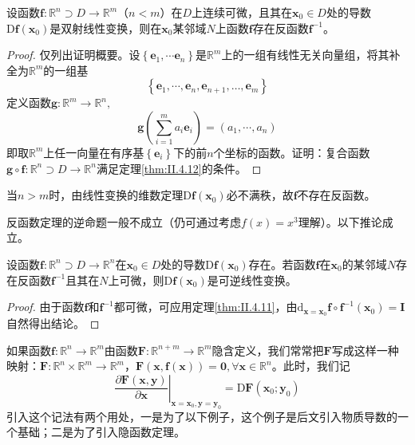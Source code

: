 \documentclass[../main.tex]{subfiles}
\begin{document}
\begin{corollary}
    设函数$\mathbf{f}:\mathbb{R}^n\supset D\rightarrow\mathbb{R}^m$（$n<m$）在$D$上连续可微，且其在$\mathbf{x}_0\in D$处的导数$\mathrm{D}\mathbf{f}\left(\mathbf{x}_0\right)$是双射线性变换，则在$\mathbf{x}_0$某邻域$N$上函数$\mathbf{f}$存在反函数$\mathbf{f}^{-1}$。
\end{corollary}
\begin{proof}
    仅列出证明概要。设$\left\{\mathbf{e}_1,\cdots\mathbf{e}_n\right\}$是$\mathbb{R}^m$上的一组有线性无关向量组，将其补全为$\mathbb{R}^m$的一组基
    \[\left\{\mathbf{e}_1,\cdots,\mathbf{e}_n,\mathbf{e}_{n+1},\dots,\mathbf{e}_m\right\}\]
    定义函数$\mathbf{g}:\mathbb{R}^m\rightarrow\mathbb{R}^n,$
    \[\mathbf{g}\left(\sum_{i=1}^m a_i\mathbf{e}_i\right)=\left(a_1,\cdots,a_n\right)\]
    即取$\mathbb{R}^m$上任一向量在有序基$\left\{\mathbf{e}_i\right\}$下的前$n$个坐标的函数。证明：复合函数$\mathbf{g}\circ\mathbf{f}:\mathbb{R}^n\supset D\rightarrow\mathbb{R}^n$满足定理\ref{thm:II.4.12}的条件。

\end{proof}

当$n>m$时，由线性变换的维数定理$\mathrm{D}\mathbf{f}\left(\mathbf{x}_0\right)$必不满秩，故$\mathbf{f}$不存在反函数。

反函数定理的逆命题一般不成立（仍可通过考虑$f\left(x\right)=x^3$理解）。以下推论成立。

\begin{corollary}
    设函数$\mathbf{f}:\mathbb{R}^n\supset D\rightarrow\mathbb{R}^n$在$\mathbf{x}_0\in D$处的导数$\mathrm{D}\mathbf{f}\left(\mathbf{x}_0\right)$存在。若函数$\mathbf{f}$在$\mathbf{x}_0$的某邻域$N$存在反函数$\mathbf{f}^{-1}$且其在$N$上可微，则$\mathrm{D}\mathbf{f}\left(\mathbf{x}_0\right)$是可逆线性变换。
\end{corollary}
\begin{proof}
    由于函数$\mathbf{f}$和$\mathbf{f}^{-1}$都可微，可应用定理\ref{thm:II.4.11}，由$\mathrm{d}_{\mathbf{x}=\mathbf{x}_0}\mathbf{f}\circ\mathbf{f}^{-1}\left(\mathbf{x}_0\right)=\mathbf{I}$自然得出结论。
\end{proof}

如果函数$\mathbf{f}:\mathbb{R}^n\rightarrow\mathbb{R}^m$由函数$\mathbf{F}:\mathbb{R}^{n+m}\rightarrow\mathbb{R}^m$隐含定义，我们常常把$\mathbf{F}$写成这样一种映射：$\mathbf{F}:\mathbb{R}^n\times\mathbb{R}^m\rightarrow\mathbb{R}^m$，$\mathbf{F}\left(\mathbf{x},\mathbf{f}\left(\mathbf{x}\right)\right)=\mathbf{0},\forall\mathbf{x}\in\mathbb{R}^n$。此时，我们记
\[\left.\frac{\partial \mathbf{F}\left(\mathbf{x},\mathbf{y}\right)}{\partial \mathbf{x}}\right|_{\mathbf{x}=\mathbf{x}_0,\mathbf{y}=\mathbf{y}_0}=
    \mathrm{D}\mathbf{F}\left(\mathbf{x}_0;\mathbf{y}_0\right)\]
引入这个记法有两个用处，一是为了以下例子，这个例子是后文引入物质导数的一个基础；二是为了引入隐函数定理。
\end{document}
